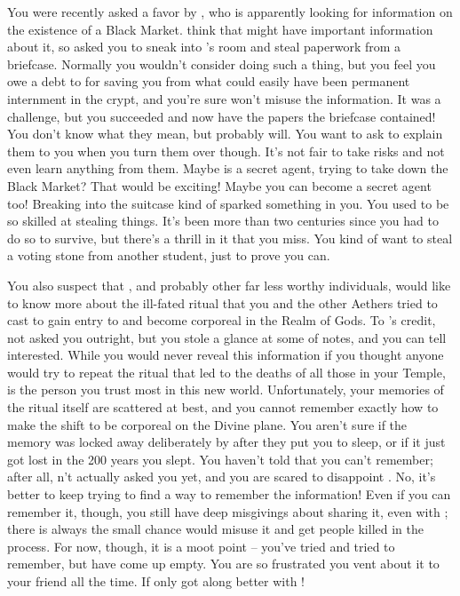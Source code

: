 \documentclass[char]{GL2020}
\begin{document}
You were recently asked a favor by \cWildCard{}, who is apparently looking for information on the existence of a Black Market. \cWildCard{\they} think\cWildCard{\plural} that \cBunker{\full} might have important information about it, so \cWildCard{\they} asked you to sneak into \cBunker{}'s room and steal paperwork from a briefcase. Normally you wouldn't consider doing such a thing, but you feel you owe a debt to \cWildCard{} for saving you from what could easily have been permanent internment in the crypt, and you're sure \cWildCard{\they} won't misuse the information. It was a challenge, but you succeeded and now have the papers the briefcase contained! You don't know what they mean, but \cWildCard{} probably will. You want to ask \cWildCard{} to explain them to you when you turn them over though. It's not fair to take risks and not even learn anything from them. Maybe \cWildCard{} is a secret agent, trying to take down the Black Market? That would be exciting! Maybe you can become a secret agent too! Breaking into the suitcase kind of sparked something in you. You used to be so skilled at stealing things. It's been more than two centuries since you had to do so to survive, but there's a thrill in it that you miss. You kind of want to steal a voting stone from another student, just to prove you can.

You also suspect that \cWildCard{}, and probably other far less worthy individuals, would like to know more about the ill-fated ritual that you and the other Aethers tried to cast to gain entry to and become corporeal in the Realm of Gods. To \cWildCard{}'s credit, \cWildCard{\they} \cWildCard{\have} not asked you outright, but you stole a glance at some of  notes, and you can tell \cWildCard{\theyare} interested. While you would never reveal this information if you thought anyone would try to repeat the ritual that led to the deaths of all those in your Temple, \cWildCard{} is the person you trust most in this new world. Unfortunately, your memories of the ritual itself are scattered at best, and you cannot remember exactly how to make the shift to be corporeal on the Divine plane. You aren't sure if the memory was locked away deliberately by \cDisneyMentor{} after they put you to sleep, or if it just got lost in the 200 years you slept. You haven't told \cWildCard{} that you can't remember; after all, \cWildCard{\they} \cWildCard{\have}n't actually asked you yet, and you are scared to disappoint \cWildCard{\them}. No, it's better to keep trying to find a way to remember the information! Even if you can remember it, though, you still have deep misgivings about sharing it, even with \cWildCard{}; there is always the small chance \cWildCard{\they} would misuse it and get people killed in the process. For now, though, it is a moot point – you've tried and tried to remember, but have come up empty. You are so frustrated you vent about it to your friend \cTechStar{} all the time. If only \cTechStar{\they} got along better with \cWildCard{}!
\end{document}
